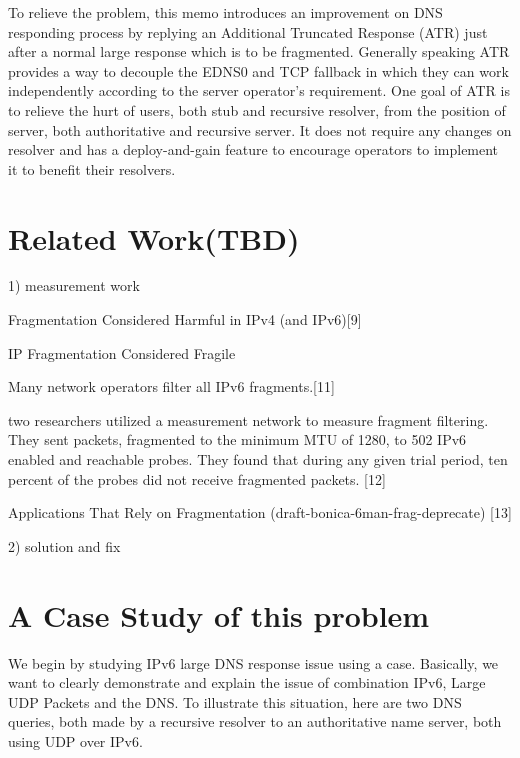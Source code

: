 To relieve the problem, this memo introduces an improvement on
DNS responding process by replying an Additional Truncated Response
(ATR) just after a normal large response which is to be fragmented.
Generally speaking ATR provides a way to decouple the EDNS0 and TCP
fallback in which they can work independently according to the server
operator's requirement.  One goal of ATR is to relieve the hurt of
users, both stub and recursive resolver, from the position of server,
both authoritative and recursive server.  It does not require any
changes on resolver and has a deploy-and-gain feature to encourage
operators to implement it to benefit their resolvers.



\section{Related Work(TBD)}


1) measurement work

Fragmentation Considered Harmful in IPv4 (and IPv6)[9]

IP Fragmentation Considered Fragile 

Many network operators filter all IPv6 fragments.[11]

two researchers utilized a measurement network to measure 
fragment filtering.  They sent packets, fragmented to the 
minimum MTU of 1280, to 502 IPv6 enabled and reachable 
probes. They found that during any given trial period, 
ten percent of the probes did not receive fragmented packets. [12]

Applications That Rely on Fragmentation (draft-bonica-6man-frag-deprecate) [13]

2) solution and fix


\section{A Case Study of this problem}

We begin by studying IPv6 large DNS response issue using a 
case. Basically, we want to clearly demonstrate and explain 
the issue of combination IPv6, Large UDP Packets and the DNS. 
To illustrate this situation, here are two DNS queries, 
both made by a recursive resolver to an authoritative 
name server, both using UDP over IPv6.

